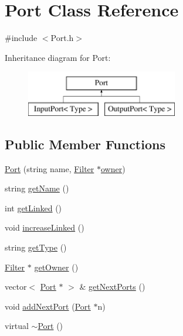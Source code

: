 \hypertarget{classPort}{\section{Port Class Reference}
\label{classPort}
}


{\ttfamily \#include $<$Port.\-h$>$}

Inheritance diagram for Port\-:\begin{figure}[H]
\begin{center}
\leavevmode
\includegraphics[height=2.000000cm]{classPort}
\end{center}
\end{figure}
\subsection*{Public Member Functions}
\begin{DoxyCompactItemize}
\item 
\hyperlink{classPort_a664b8cba25b5e7201a80e96827acaa60}{Port} (string name, \hyperlink{classFilter}{Filter} $\ast$\hyperlink{classPort_a09f3613b92c0d46d0aa8c3239102a3ca}{owner})
\item 
string \hyperlink{classPort_a16e393f7d744d91a7d7f8eb6bd675860}{get\-Name} ()
\item 
int \hyperlink{classPort_a8bcebf2e996d12b8bc57cbf17a44ceed}{get\-Linked} ()
\item 
void \hyperlink{classPort_ab3f05bf2221eff2c073e43c215b9507d}{increase\-Linked} ()
\item 
string \hyperlink{classPort_a9a42f2968f394a57b146e8909349c65e}{get\-Type} ()
\item 
\hyperlink{classFilter}{Filter} $\ast$ \hyperlink{classPort_ac579bc6a77317e121b3922757449018c}{get\-Owner} ()
\item 
vector$<$ \hyperlink{classPort}{Port} $\ast$ $>$ \& \hyperlink{classPort_a9004fcb7c9568ca55857ca37fc3c5c61}{get\-Next\-Ports} ()
\item 
void \hyperlink{classPort_aa78af70b4c46ed8b7a4ee127d5d46d8d}{add\-Next\-Port} (\hyperlink{classPort}{Port} $\ast$n)
\item 
virtual \hyperlink{classPort_a2a6f52a2c46c5f98a3f557707be45c54}{$\sim$\-Port} ()
\end{DoxyCompactItemize}
